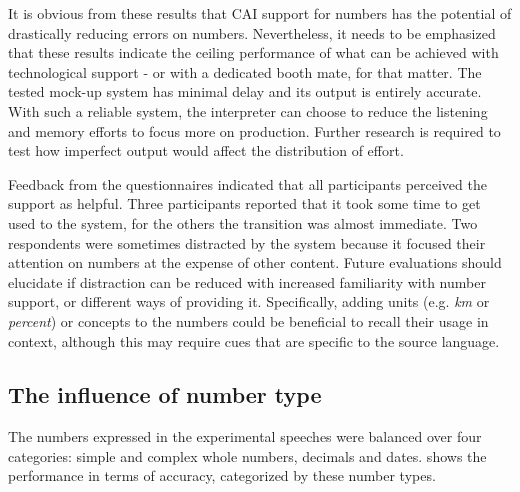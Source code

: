 \documentclass[output=paper]{langsci/langscibook}
\begin{document}
It is obvious from these results that \textsc{CAI} support for numbers has the potential of drastically reducing errors on numbers. Nevertheless, it needs to be emphasized that these results indicate the ceiling performance of what can be achieved with technological support - or with a dedicated booth mate, for that matter. The tested mock-up system has minimal delay and its output is entirely accurate. With such a reliable system, the interpreter can choose to reduce the listening and memory efforts to focus more on production. Further research is required to test how imperfect output would affect the distribution of effort.

Feedback from the questionnaires indicated that all participants perceived the support as helpful. Three participants reported that it took some time to get used to the system, for the others the transition was almost immediate. Two respondents were sometimes distracted by the system because it focused their attention on numbers at the expense of other content. Future evaluations should elucidate if distraction can be reduced with increased familiarity with number support, or different ways of providing it. Specifically, adding units (e.g. \textit{km} or \textit{percent}) or concepts to the numbers could be beneficial to recall their usage in context, although this may require cues that are specific to the source language.

\subsection{The influence of number type}
The numbers expressed in the experimental speeches were balanced over four categories: simple and complex whole numbers, decimals and dates.  shows the performance in terms of accuracy, categorized by these number types.
\end{document}
